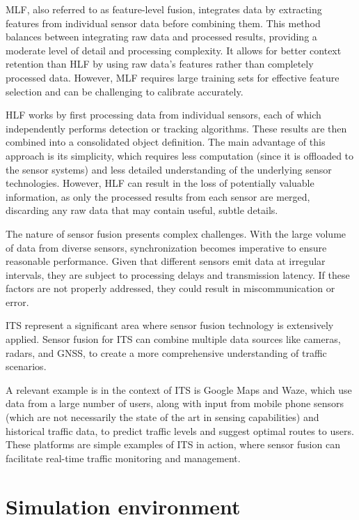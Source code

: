 MLF, also referred to as feature-level fusion, integrates data by extracting features from individual sensor data before combining them. This method balances between integrating raw data and processed results,  providing a moderate level of detail and processing complexity. It allows for better context retention than HLF by using raw data’s features rather than completely processed data. However, MLF requires large training sets for effective feature selection and can be challenging to calibrate accurately.

HLF works by first processing data from individual sensors, each of which independently performs detection or tracking algorithms. These results are then combined into a consolidated object definition. The main advantage of this approach is its simplicity, which requires less computation (since it is offloaded to the sensor systems) and less detailed understanding of the underlying sensor technologies. However, HLF can result in the loss of potentially valuable information, as only the processed results from each sensor are merged, discarding any raw data that may contain useful, subtle details.

The nature of sensor fusion presents complex challenges. With the large volume of data from diverse sensors, synchronization becomes imperative to ensure reasonable performance. Given that different sensors emit data at irregular intervals, they are subject to processing delays and transmission latency. If these factors are not properly addressed, they could result in miscommunication or error.

ITS represent a significant area where sensor fusion technology is extensively applied. Sensor fusion for ITS can combine multiple data sources like cameras, radars, and GNSS, to create a more comprehensive understanding of traffic scenarios.

A relevant example is in the context of ITS is Google Maps and Waze, which use data from a large number of users, along with input from mobile phone sensors (which are not necessarily the state of the art in sensing capabilities) and historical traffic data, to predict traffic levels and suggest optimal routes to users. These platforms are simple examples of ITS in action, where sensor fusion can facilitate real-time traffic monitoring and management.

\section{Simulation environment}\label{sim-env}


